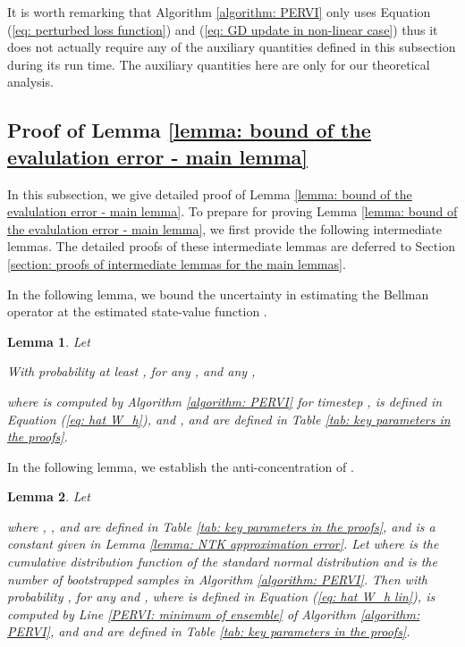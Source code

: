 \documentclass{article} \usepackage{iclr2023/iclr2023_conference,times}
\newtheorem{lemma}{Lemma}[section]
\begin{document}
It is worth remarking that Algorithm \ref{algorithm: PERVI} only uses Equation (\ref{eq: perturbed loss function}) and (\ref{eq: GD update in non-linear case}) thus it does not actually require any of the auxiliary quantities defined in this subsection during its run time. The auxiliary quantities here are only for our theoretical analysis. 

\subsection{Proof of Lemma \ref{lemma: bound of the evalulation error - main lemma}}
In this subsection, we give detailed proof of Lemma \ref{lemma: bound of the evalulation error - main lemma}. To prepare for proving Lemma \ref{lemma: bound of the evalulation error - main lemma}, we first provide the following intermediate lemmas. The detailed proofs of these intermediate lemmas are deferred to Section \ref{section: proofs of intermediate lemmas for the main lemmas}. 


In the following lemma, we bound the uncertainty  in estimating the Bellman operator at the estimated state-value function . 
\begin{lemma}
Let 




 With probability at least , for any , and any ,
 
where  is computed by Algorithm \ref{algorithm: PERVI} for timestep ,  is defined in Equation (\ref{eq: hat W_h}), and
,  and  are defined in Table \ref{tab: key parameters in the proofs}. 
\label{lemma: bound ERM with the Bellman target}
\end{lemma}

In the following lemma, we establish the anti-concentration of . 
\begin{lemma}
Let 

where , ,  and  are defined in Table \ref{tab: key parameters in the proofs}, and  is a constant given in Lemma \ref{lemma: NTK approximation error}. Let  where  is the cumulative distribution function of the standard normal distribution and  is the number of bootstrapped samples in Algorithm \ref{algorithm: PERVI}. Then with probability , for any  and , 
where  is defined in Equation (\ref{eq: hat W_h lin}),  is computed by Line \ref{PERVI: minimum of ensemble} of Algorithm \ref{algorithm: PERVI}, and  and  are defined in Table \ref{tab: key parameters in the proofs}. 
\label{Lemma: anti-concentration of tilde Q}
\end{lemma}
\end{document}
